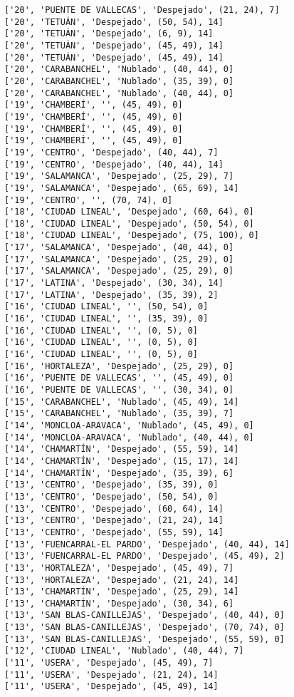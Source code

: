 \documentclass[11pt]{article}
\begin{document}
\begin{Verbatim}[commandchars=\\\{\}]
['20', 'PUENTE DE VALLECAS', 'Despejado', (21, 24), 7]
['20', 'TETUÁN', 'Despejado', (50, 54), 14]
['20', 'TETUÁN', 'Despejado', (6, 9), 14]
['20', 'TETUÁN', 'Despejado', (45, 49), 14]
['20', 'TETUÁN', 'Despejado', (45, 49), 14]
['20', 'CARABANCHEL', 'Nublado', (40, 44), 0]
['20', 'CARABANCHEL', 'Nublado', (35, 39), 0]
['20', 'CARABANCHEL', 'Nublado', (40, 44), 0]
['19', 'CHAMBERÍ', '', (45, 49), 0]
['19', 'CHAMBERÍ', '', (45, 49), 0]
['19', 'CHAMBERÍ', '', (45, 49), 0]
['19', 'CHAMBERÍ', '', (45, 49), 0]
['19', 'CENTRO', 'Despejado', (40, 44), 7]
['19', 'CENTRO', 'Despejado', (40, 44), 14]
['19', 'SALAMANCA', 'Despejado', (25, 29), 7]
['19', 'SALAMANCA', 'Despejado', (65, 69), 14]
['19', 'CENTRO', '', (70, 74), 0]
['18', 'CIUDAD LINEAL', 'Despejado', (60, 64), 0]
['18', 'CIUDAD LINEAL', 'Despejado', (50, 54), 0]
['18', 'CIUDAD LINEAL', 'Despejado', (75, 100), 0]
['17', 'SALAMANCA', 'Despejado', (40, 44), 0]
['17', 'SALAMANCA', 'Despejado', (25, 29), 0]
['17', 'SALAMANCA', 'Despejado', (25, 29), 0]
['17', 'LATINA', 'Despejado', (30, 34), 14]
['17', 'LATINA', 'Despejado', (35, 39), 2]
['16', 'CIUDAD LINEAL', '', (50, 54), 0]
['16', 'CIUDAD LINEAL', '', (35, 39), 0]
['16', 'CIUDAD LINEAL', '', (0, 5), 0]
['16', 'CIUDAD LINEAL', '', (0, 5), 0]
['16', 'CIUDAD LINEAL', '', (0, 5), 0]
['16', 'HORTALEZA', 'Despejado', (25, 29), 0]
['16', 'PUENTE DE VALLECAS', '', (45, 49), 0]
['16', 'PUENTE DE VALLECAS', '', (30, 34), 0]
['15', 'CARABANCHEL', 'Nublado', (45, 49), 14]
['15', 'CARABANCHEL', 'Nublado', (35, 39), 7]
['14', 'MONCLOA-ARAVACA', 'Nublado', (45, 49), 0]
['14', 'MONCLOA-ARAVACA', 'Nublado', (40, 44), 0]
['14', 'CHAMARTÍN', 'Despejado', (55, 59), 14]
['14', 'CHAMARTÍN', 'Despejado', (15, 17), 14]
['14', 'CHAMARTÍN', 'Despejado', (35, 39), 6]
['13', 'CENTRO', 'Despejado', (35, 39), 0]
['13', 'CENTRO', 'Despejado', (50, 54), 0]
['13', 'CENTRO', 'Despejado', (60, 64), 14]
['13', 'CENTRO', 'Despejado', (21, 24), 14]
['13', 'CENTRO', 'Despejado', (55, 59), 14]
['13', 'FUENCARRAL-EL PARDO', 'Despejado', (40, 44), 14]
['13', 'FUENCARRAL-EL PARDO', 'Despejado', (45, 49), 2]
['13', 'HORTALEZA', 'Despejado', (45, 49), 7]
['13', 'HORTALEZA', 'Despejado', (21, 24), 14]
['13', 'CHAMARTÍN', 'Despejado', (25, 29), 14]
['13', 'CHAMARTÍN', 'Despejado', (30, 34), 6]
['13', 'SAN BLAS-CANILLEJAS', 'Despejado', (40, 44), 0]
['13', 'SAN BLAS-CANILLEJAS', 'Despejado', (70, 74), 0]
['13', 'SAN BLAS-CANILLEJAS', 'Despejado', (55, 59), 0]
['12', 'CIUDAD LINEAL', 'Nublado', (40, 44), 7]
['11', 'USERA', 'Despejado', (45, 49), 7]
['11', 'USERA', 'Despejado', (21, 24), 14]
['11', 'USERA', 'Despejado', (45, 49), 14]

\end{Verbatim}
\end{document}
